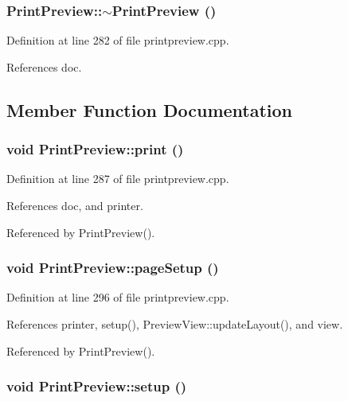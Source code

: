 \subsubsection{\setlength{\rightskip}{0pt plus 5cm}Print\-Preview::$\sim$Print\-Preview ()\hspace{0.3cm}{\tt  [virtual]}}\label{classPrintPreview_7620c66982952f0a2eb6a90c5365c749}




Definition at line 282 of file printpreview.cpp.

References doc.

\subsection{Member Function Documentation}
\subsubsection{\setlength{\rightskip}{0pt plus 5cm}void Print\-Preview::print ()\hspace{0.3cm}{\tt  [private, slot]}}\label{classPrintPreview_9a73167bed277aa998936f959e0cf598}




Definition at line 287 of file printpreview.cpp.

References doc, and printer.

Referenced by Print\-Preview().
\subsubsection{\setlength{\rightskip}{0pt plus 5cm}void Print\-Preview::page\-Setup ()\hspace{0.3cm}{\tt  [private, slot]}}\label{classPrintPreview_4f5333b436359e1663bb9fd5b5e1838e}




Definition at line 296 of file printpreview.cpp.

References printer, setup(), Preview\-View::update\-Layout(), and view.

Referenced by Print\-Preview().
\subsubsection{\setlength{\rightskip}{0pt plus 5cm}void Print\-Preview::setup ()\hspace{0.3cm}{\tt  [private]}}\label{classPrintPreview_040afcf971a6697122e68ad30ff1a6b2}




